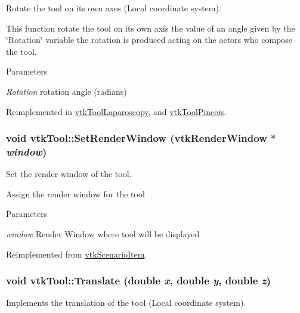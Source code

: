 Rotate the tool on its own axes (Local coordinate system). 

This function rotate the tool on its own axis the value of an angle given by the \char`\"{}Rotation\char`\"{} variable the rotation is produced acting on the actors who compose the tool. 
\begin{DoxyParams}{Parameters}
\item[{\em Rotation}]rotation angle (radians) \end{DoxyParams}


Reimplemented in \hyperlink{classvtkToolLaparoscopy_a3849ce4caa8283696433cb1ac0466bc5}{vtkToolLaparoscopy}, and \hyperlink{classvtkToolPincers_ad7a4a9f0e3291b88eb4e30986784539a}{vtkToolPincers}.

\hypertarget{classvtkTool_a8f036524a724871dd5f7317e3000611c}{
\subsubsection[{SetRenderWindow}]{\setlength{\rightskip}{0pt plus 5cm}void vtkTool::SetRenderWindow (vtkRenderWindow $\ast$ {\em window})}}
\label{classvtkTool_a8f036524a724871dd5f7317e3000611c}


Set the render window of the tool. 

Assign the render window for the tool 
\begin{DoxyParams}{Parameters}
\item[{\em window}]Render Window where tool will be displayed \end{DoxyParams}


Reimplemented from \hyperlink{classvtkScenarioItem_a3ce404404d36c342b947f29fa02b6170}{vtkScenarioItem}.

\hypertarget{classvtkTool_a4749077c4b6e05d9dc965a94c0ca14a0}{
\subsubsection[{Translate}]{\setlength{\rightskip}{0pt plus 5cm}void vtkTool::Translate (double {\em x}, \/  double {\em y}, \/  double {\em z})}}
\label{classvtkTool_a4749077c4b6e05d9dc965a94c0ca14a0}


Implements the translation of the tool (Local coordinate system). 


